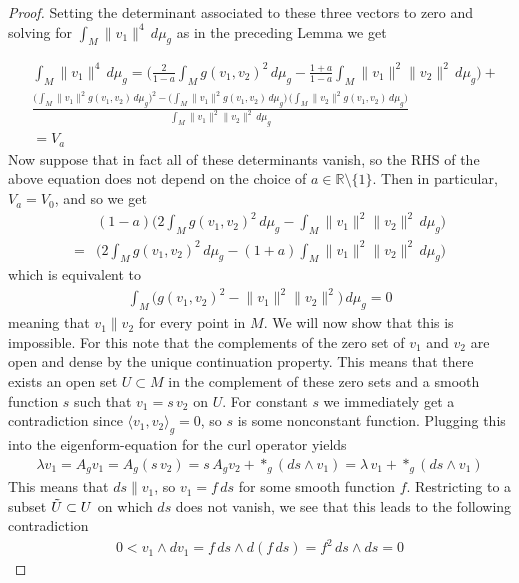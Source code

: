 \begin{proof}
    Setting the determinant associated to these three vectors to zero and solving for $\int_M \lVert v_1\rVert^4\,d\mu_g$ as in the preceding Lemma we get

\begin{align*}
&\int_M\lVert v_1\rVert^4\,d\mu_g=\bigg(\frac{2}{1-a}\int_M g(v_1,v_2)^2\,d\mu_g-\frac{1+a}{1-a}\int_M \lVert v_1\rVert^2 \lVert v_2\rVert ^2\,d\mu_g\bigg)+\\
&\frac{\bigg(\int_M \lVert v_1 \rVert^2 g(v_1,v_2)\,d\mu_g\bigg)^2-\bigg(\int_M \lVert v_1 \rVert^2 g(v_1,v_2)\,d\mu_g\bigg)\,\bigg(\int_M \lVert v_2 \rVert^2 g(v_1,v_2)\,d\mu_g\bigg)}{\int_M \lVert v_1\rVert^2 \lVert v_2\rVert^2\,d\mu_g}\\
& =V_a
\end{align*}
Now suppose that in fact all of these determinants vanish, so the RHS of the above equation does not depend on the choice of $a\in \mathbb{R}\setminus \{1\}$. Then in particular, $V_a=V_0$, and so we get 
\begin{align*}
    &(1-a)\bigg(2\int_M g(v_1,v_2)^2\,d\mu_g-\int_M \lVert v_1\rVert^2\lVert v_2\rVert^2\,d\mu_g\bigg)\\
    =&\bigg(2\int_M g(v_1,v_2)^2\,d\mu_g-(1+a)\int_M \lVert v_1\rVert^2\lVert v_2\rVert^2\,d\mu_g\bigg)
\end{align*}
which is equivalent to 
\begin{align*}
    \int_M \big(g(v_1,v_2)^2-\lVert v_1\rVert^2\lVert v_2\rVert^2\big)\,d\mu_g=0
\end{align*}
meaning that $v_1\parallel v_2$ for every point in $M$. We will now show that this is impossible.
For this note that the complements of the zero set of $v_1$ and $v_2$ are open and dense by the unique continuation property. This means that there exists an open set $U\subset M$ in the complement of these zero sets and a smooth function $s$ such that $v_1=s\,v_2$ on $U$. For constant $s$ we immediately get a contradiction since $\langle v_1,v_2\rangle_g=0$, so $s$ is some nonconstant function. Plugging this into the eigenform-equation for the curl operator yields
\begin{align*}
    \lambda v_1=A_g v_1=A_g (s\,v_2)=s\,A_g v_2 +\ast_g (ds\wedge v_1)=\lambda\,v_1+\ast_g (ds\wedge v_1)
\end{align*}
This means that $ds\parallel v_1$, so $v_1=f\,ds$ for some smooth function $f$. Restricting to a subset $\Tilde{U}\subset U$ on which $ds$ does not vanish, we see that this leads to the following contradiction
\begin{align*}
    0 < v_1\wedge dv_1 = f\,ds\wedge d(f\,ds)=f^2\,ds\wedge ds =0
\end{align*}
\end{proof}

